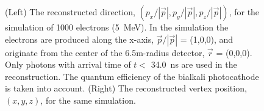 \documentclass[cits]{JINST}
\begin{document}
\begin{figure}[tbh]
        \begin{center}
        \caption[]{\label{fig:reco} (Left) The reconstructed direction,
        $(p_x/|\vec{p}|, p_y/|\vec{p}|,
        p_z/|\vec{p}|)$, for the simulation of 1000 electrons
        (5~MeV). In the simulation the electrons are produced along the
        x-axis, $\vec{p}/|\vec{p}|$ = (1,0,0), and originate
        from the center of the 6.5m-radius detector, $\vec{r}$ =
        (0,0,0). Only photons with arrival time of $t<$ 34.0~ns are used
        in the reconstruction. The quantum efficiency of the bialkali
        photocathode is taken into account. (Right) The reconstructed
        vertex position, $(x,y,z)$, for the same simulation.}
\end{center}
\end{figure}
\end{document}
